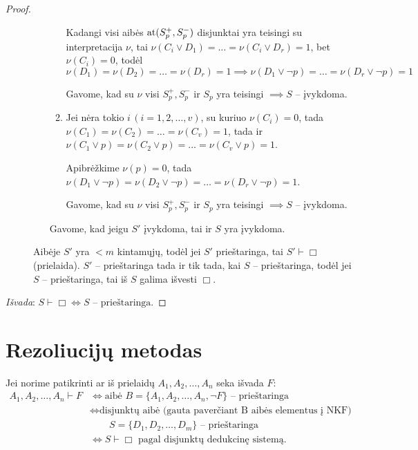 \begin{prop}
\begin{proof}
\begin{description}
\begin{enumerate}
\begin{enumerate}
                Kadangi visi aibės $\operatorname{at}(S_{p}^{+}, S_{p}^{-})$ disjunktai 
                yra teisingi su interpretacija $\nu$, tai 
                $\nu(C_i \lor D_1) = \dots = \nu(C_i \lor D_r) = 1$, bet
                $\nu(C_i) = 0$, todėl 
                $\nu(D_1) = \nu(D_2) = \dots = \nu(D_r) = 1 \implies %
                \nu(D_1 \lor \neg p) = \dots = \nu(D_r \lor \neg p) = 1$

                Gavome, kad su $\nu$ visi $S_{p}^{+}, S_{p}^{-}$ ir 
                $S_{p}$ yra teisingi $\implies S$ – įvykdoma.

              \item Jei nėra tokio $i \, (i=1,2,\dotsc,v)$, su kuriuo
                $\nu(C_{i}) = 0$, tada 
                $\nu(C_1) = \nu(C_2) = \dots = \nu(C_v) = 1$, tada ir
                $\nu(C_1 \lor p) = \nu(C_2 \lor p) = \dots =%
                  \nu(C_v \lor p) = 1$.

                Apibrėžkime $\nu(p) = 0$, tada 
                $\nu(D_{1} \lor \neg p) = \nu(D_{2} \lor \neg p) = \dots =%
                \nu(D_{r} \lor \neg p) = 1$.

                Gavome, kad su $\nu$ visi $S_{p}^{+}, S_{p}^{-}$ ir 
                $S_{p}$ yra teisingi $\implies S$ – įvykdoma.

            \end{enumerate}
            Gavome, kad jeigu $S'$ įvykdoma, tai ir $S$ yra įvykdoma.

        \end{enumerate} 
        Aibėje $S'$ yra $< m$ kintamųjų, todėl jei $S'$ prieštaringa,
        tai $S' \vdash \Box$ (prielaida). $S'$ – prieštaringa 
        tada ir tik tada, kai $S$ – prieštaringa, todėl jei 
        $S$ – prieštaringa, tai iš $S$ galima išvesti $\Box$.
    \end{description}

    \emph{Išvada}: $S \vdash \Box \iff S \text{ – prieštaringa}$.

  \end{proof}

\end{prop}

\section{Rezoliucijų metodas}

Jei norime patikrinti ar iš prielaidų $A_1,A_2,\dotsc,A_n$ seka išvada $F$:
\begin{align*}
  A_1,A_2,\dotsc,A_n \vdash F%
  &\iff \text {aibė } B = \{A_1,A_2,\dotsc,A_n,\neg F\}%
    \text{ – prieštaringa} \\
  &\iff \text{disjunktų aibė (gauta paverčiant B aibės elementus į NKF)}\\
  & \qquad  S = \{D_1,D_2,\dotsc,D_m\} \text{ – prieštaringa} \\
  &\iff S \vdash \Box \text{ pagal disjunktų dedukcinę sistemą}.
\end{align*}
